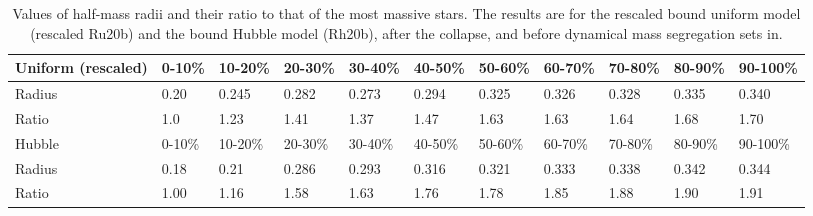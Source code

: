 \begin{table*}
\caption{Values of half-mass radii and their ratio to that of the most massive stars. The results are for the rescaled bound uniform model (rescaled Ru20b) and the bound Hubble model (Rh20b), after the collapse, and before dynamical mass segregation sets in.} \label{Tab:RhmVal}
\begin{tabular}{l|llllllllll}
Uniform (rescaled) & 0-10\% & 10-20\% & 20-30\% & 30-40\% & 40-50\% & 50-60\% & 60-70\% & 70-80\% & 80-90\% & 90-100\% \\
\hline
Radius   & 0.20 & 0.245 & 0.282 & 0.273 & 0.294 & 0.325 & 0.326 &  0.328 & 0.335 & 0.340 \\
Ratio    & 1.0 & 1.23 & 1.41 & 1.37 & 1.47  & 1.63 & 1.63 &  1.64 & 1.68 & 1.70 \\

\hline
Hubble  & 0-10\% & 10-20\% & 20-30\% & 30-40\% & 40-50\% & 50-60\% & 60-70\% & 70-80\% & 80-90\% & 90-100\% \\
\hline
Radius  &  0.18 & 0.21 & 0.286 & 0.293 & 0.316 & 0.321 & 0.333 & 0.338 & 0.342 & 0.344 \\
 Ratio       & 1.00 & 1.16 & 1.58 & 1.63 & 1.76  & 1.78  & 1.85 &  1.88 & 1.90 &  1.91 \\
\end{tabular}
\end{table*}



